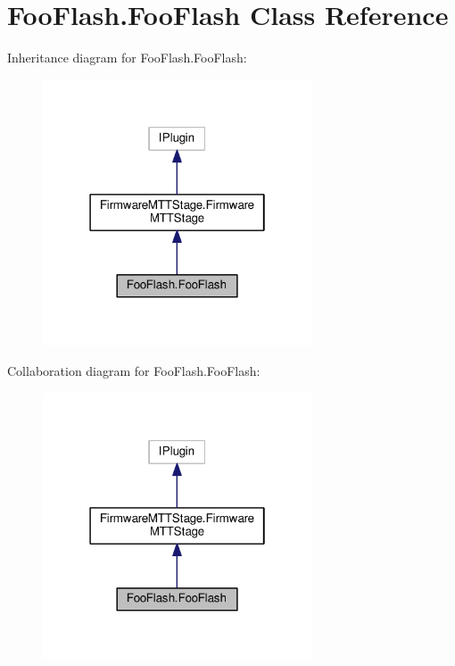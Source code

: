 \hypertarget{classFooFlash_1_1FooFlash}{\section{Foo\-Flash.\-Foo\-Flash Class Reference}
\label{classFooFlash_1_1FooFlash}
}


Inheritance diagram for Foo\-Flash.\-Foo\-Flash\-:
\nopagebreak
\begin{figure}[H]
\begin{center}
\leavevmode
\includegraphics[width=226pt]{classFooFlash_1_1FooFlash__inherit__graph}
\end{center}
\end{figure}


Collaboration diagram for Foo\-Flash.\-Foo\-Flash\-:
\nopagebreak
\begin{figure}[H]
\begin{center}
\leavevmode
\includegraphics[width=226pt]{classFooFlash_1_1FooFlash__coll__graph}
\end{center}
\end{figure}
